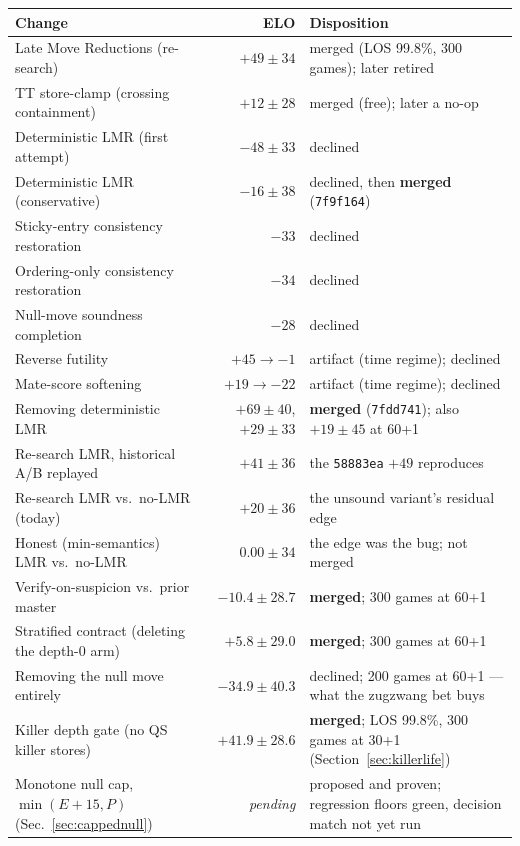 \documentclass[11pt]{article}
\theoremstyle{plain}
\theoremstyle{definition}
\theoremstyle{remark}
\begin{document}
\begin{table}[h]
\centering
\small
\begin{tabular}{@{}lrp{6.6cm}@{}}
\toprule
\textbf{Change} & \textbf{ELO} & \textbf{Disposition}\\
\midrule
Late Move Reductions (re-search) & $+49 \pm 34$ & merged (LOS 99.8\%, 300 games); later retired\\
TT store-clamp (crossing containment) & $+12 \pm 28$ & merged (free); later a no-op\\
\midrule
Deterministic LMR (first attempt) & $-48 \pm 33$ & declined\\
Deterministic LMR (conservative) & $-16 \pm 38$ & declined, then \textbf{merged} (\texttt{7f9f164})\\
Sticky-entry consistency restoration & $-33$ & declined\\
Ordering-only consistency restoration & $-34$ & declined\\
Null-move soundness completion & $-28$ & declined\\
\midrule
Reverse futility & $+45 \to -1$ & artifact (time regime); declined\\
Mate-score softening & $+19 \to -22$ & artifact (time regime); declined\\
\midrule
Removing deterministic LMR & $+69 \pm 40$, $+29 \pm 33$ & \textbf{merged} (\texttt{7fdd741}); also $+19 \pm 45$ at 60+1\\
Re-search LMR, historical A/B replayed & $+41 \pm 36$ & the \texttt{58883ea} $+49$ reproduces\\
Re-search LMR vs.\ no-LMR (today) & $+20 \pm 36$ & the unsound variant's residual edge\\
Honest (min-semantics) LMR vs.\ no-LMR & $0.00 \pm 34$ & the edge was the bug; not merged\\
\midrule
Verify-on-suspicion vs.\ prior master & $-10.4 \pm 28.7$ & \textbf{merged}; 300 games at 60+1\\
Stratified contract (deleting the depth-0 arm) & $+5.8 \pm 29.0$ & \textbf{merged}; 300 games at 60+1\\
Removing the null move entirely & $-34.9 \pm 40.3$ & declined; 200 games at 60+1 --- what the zugzwang bet buys\\
\midrule
Killer depth gate (no QS killer stores) & $+41.9 \pm 28.6$ & \textbf{merged}; LOS 99.8\%, 300 games at 30+1 (Section~\ref{sec:killerlife})\\
Monotone null cap, $\min(E+15, P)$ (Sec.~\ref{sec:cappednull}) & \emph{pending} & proposed and proven; regression floors green, decision match not yet run\\

\end{tabular}
\end{table}
\end{document}
